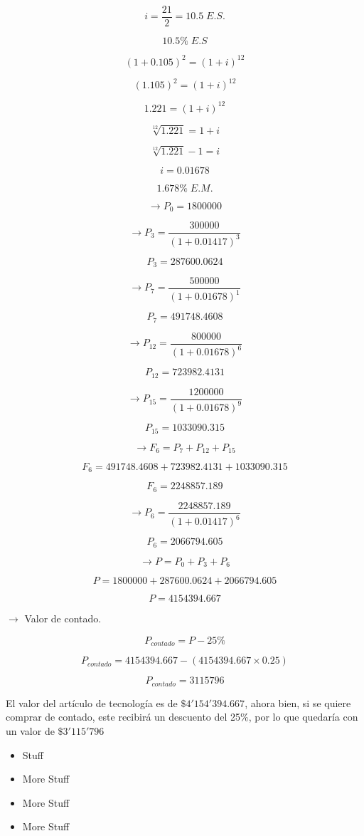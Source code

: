 \documentclass[12pt, letterpaper, twoside]{article}
\begin{document}
\[ i = \frac{21}{2} = 10.5 \; E.S. \]

\[ 10.5\% \; E.S \]

\[ (1 + 0.105)^2 = (1 + i)^{12} \]

\[ (1.105)^2 = (1 + i)^{12} \]

\[ 1.221 = (1 + i)^{12} \]

\[ \sqrt[12]{1.221} = 1 + i \]

\[ \sqrt[12]{1.221} - 1 = i \]

\[ i = 0.01678 \]

\[ 1.678\% \; E.M. \]

\[ \rightarrow P_0 = 1800000 \]

\[ \rightarrow P_3 = \frac{300000}{(1 + 0.01417)^3} \]

\[ P_3 = 287600.0624 \]

\[ \rightarrow P_7 = \frac{500000}{(1 + 0.01678)^1} \]

\[ P_7 = 491748.4608 \]

\[ \rightarrow P_{12} = \frac{800000}{(1 + 0.01678)^6} \]

\[ P_{12} = 723982.4131 \]

\[ \rightarrow P_{15} = \frac{1200000}{(1 + 0.01678)^9} \]

\[ P_{15} = 1033090.315 \]

\[ \rightarrow F_6 = P_7 + P_{12} + P_{15} \]

\[ F_6 = 491748.4608 + 723982.4131 + 1033090.315 \]

\[ F_6 = 2248857.189 \]

\[ \rightarrow P_6 = \frac{2248857.189}{(1 + 0.01417)^6} \]

\[ P_6 = 2066794.605\]

\[ \rightarrow P = P_0 + P_3 + P_6 \]

\[ P = 1800000 + 287600.0624 + 2066794.605\]

\[ P = 4154394.667\]

\(\rightarrow \) Valor de contado.

\[ P_{contado} = P - 25\% \]

\[ P_{contado} = 4154394.667 - (4154394.667 \times 0.25) \]

\[ P_{contado} = 3115796 \]

El valor del artículo de tecnología es de \(\$4'154'394.667\), ahora bien, si se quiere
comprar de contado, este recibirá un descuento del 25\%, por lo que quedaría con un valor
de \(\$3'115'796\) 

\begin{itemize}
  \item Stuff
  \item More Stuff
  \item More Stuff
  \item More Stuff
\end{itemize}
\end{document}
